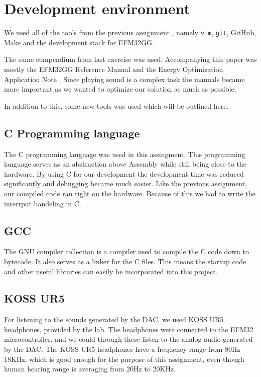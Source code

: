 \section{Development environment}
We used all of the tools from the previous assignment \cite{report-1}, namely \texttt{vim}, \texttt{git}, GitHub, Make and the development stack for EFM32GG.

The same compendium \cite{eeds-compendium} from last exercise was used.
Accompanying this paper was mostly the EFM32GG Reference Manual \cite{efm32gg-ref-man} and the Energy Optimization Application Note \cite{efm32gg-energy-op}.
Since playing sound is a complex task the manuals became more important as we wanted to optimize our solution as much as possible.

In addition to this, some new tools was used which will be outlined here.

\subsection{C Programming language}
The C programming language was used in this assingment.
This programming language serves as an abstraction above Assembly while still being close to the hardware.
By using C for our development the development time was reduced significantly and debugging became much easier.
Like the previous assignment, our compiled code ran right on the hardware.
Because of this we had to write the interrput handeling in C.

\subsection{GCC}
The GNU compiler collection is a compiler used to compile the C code down to bytecode.
It also serves as a linker for the C files. This means the startup code and other useful libraries can easily be incorporated into this project.

\subsection{KOSS UR5}
For listening to the sounds generated by the DAC, we used KOSS UR5 headphones, provided by the lab.
The headphones were connected to the EFM32 microcontroller, and we could through these listen to the analog audio generated by the DAC.
The KOSS UR5 headphones have a frequency range from 80Hz - 18KHz, which is good enough for the purpose of this assignment, even though human hearing range is averaging from 20Hz to 20KHz.
